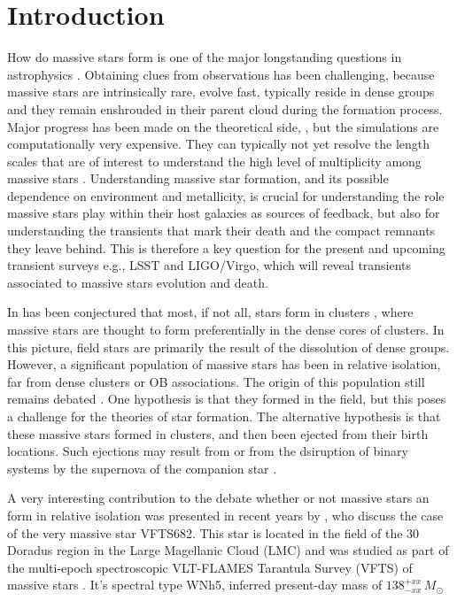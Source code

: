 \documentclass[apjl,twocolumn]{emulateapj}
\newcommand{\todo}[1]{{\large $\blacksquare$~\textbf{\color{red}[#1]}}~$\blacksquare$}
\newcommand{\SdM}[1]{{{\color{Sepia}{#1}}}}
\renewcommand{\SdM}[1]{{{{#1}}}}
\begin{document}
\section{Introduction}
\label{sec:intro}

\SdM{

How do massive stars form is one of the major longstanding questions in astrophysics
\citep[e.g.,][]{zinnecker:07}. Obtaining clues from observations has been challenging, because massive stars are intrinsically rare, 
evolve fast, typically reside in dense groups and they remain enshrouded in their parent cloud during the formation
process.  Major progress has been made on the theoretical side,  \citep[e.g.][]{Kuiper+2015,Rosen+2016}, but the simulations are computationally very expensive. They can typically not yet resolve the length scales that are of interest to understand the 
high level of multiplicity among massive stars  \citep[][]{sana:12,sana:17}.  Understanding massive star formation, and its possible dependence on environment and metallicity, is crucial for understanding the role massive stars play within their host galaxies as sources of feedback, but also for understanding the transients that mark their death and the compact remnants they leave behind.  This is therefore a key question for the present and upcoming transient surveys e.g., LSST and LIGO/Virgo,
which  will reveal transients associated to massive stars
evolution and death.

In has been conjectured that most, if not all, stars form in clusters \cite{lada:03}, where massive stars are thought to  form preferentially in the dense cores of clusters. In this picture, field stars are primarily the result of the dissolution of dense groups. 
 However, a significant population of massive stars has been  in relative isolation,  far from dense clusters or OB associations. The origin of this population still remains debated \citep{Lamb+2016}.   One hypothesis is that they  formed in the field, but this poses a challenge for the theories of star formation.  The alternative hypothesis is that these massive stars  formed in clusters, and then been ejected from their birth locations.  Such ejections may result from   \citep[e,g,][]{poveda:67} or from the dsiruption of binary systems by the supernova of the companion star  \citep[][]{zwicky:57, blaauw:61}. 
 
 A very interesting contribution to the debate whether or not massive stars an form in relative isolation was presented in recent years by  \cite{bestenlehner:11}, who discuss the case of the very massive star VFTS682.   This star is located in the field of the 30 Doradus region in the Large Magellanic Cloud (LMC) and was studied as part of the multi-epoch spectroscopic VLT-FLAMES Tarantula Survey (VFTS) of massive stars \citep{Evans+2011}.  It's spectral type WNh5,  inferred present-day mass of   $138^{+xx}_{-xx}\,M_\odot$
 
}
\end{document}
